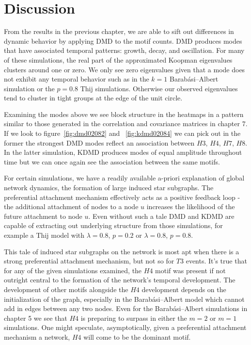 \chapter{Discussion}
From the results in the previous chapter, we are able to sift out differences in dynamic behavior by applying
 DMD to the motif counts. DMD produces modes that have associated temporal
patterns: growth, decay, and oscillation. For many of these simulations, the real part of
 the approximated Koopman eigenvalues clusters around one or zero. We only see zero eigenvalues
given that a mode does not exhibit any temporal behavior such as in the $k=1$ Barabási–Albert 
simulation or the $p=0.8$ Thij simulations. Otherwise our observed eigenvalues tend to cluster
in tight groups at the edge of the unit circle. 

Examining the modes above we see block structure in the heatmaps in a pattern similar to those 
generated in the correlation and covariance matrices in chapter 7. If we look to 
figure~\ref{fig:dmd02082} and ~\ref{fig:kdmd02084} we can pick out in the former the strongest
DMD modes reflect an association between $H3$, $H4$, $H7$, $H8$. In the latter simulation, KDMD produces
modes of equal amplitude throughout time but we can once again see the association between the same motifs. 

For certain simulations, we have a readily available a-priori explanation
of global network dynamics, the formation of large induced star subgraphs. The preferential
attachment mechanism effectively acts as a positive feedback loop - the
additional attachment of nodes to a node $u$ increases
the likelihood of the future attachment to node $u$. Even without 
 such a tale DMD and KDMD are capable of extracting out underlying 
structure from those simulations, for example a Thij model with $\lambda=0.8$, $p=0.2$ or $\lambda=0.8$, $p=0.8$.

This tale of induced star subgraphs on the network is most apt when
there is a strong preferential attachment mechanism, but not so for $T3$ events.
 It's true that for any of the given simulations examined, the $H4$ motif was present if not outright
central to the formation of the network's temporal development. The development
of other motifs alongside the $H4$ development depends on the initialization
of the graph, especially in the Barabási–Albert model which cannot add in
edges between any two nodes. Even for the Barabási–Albert simulations in chapter 5 
we see that $H4$ is preparing to surpass in either the $m=2$ or $m=1$
simulations. One might speculate, asymptotically, given a preferential attachment
mechanism a network, $H4$ will come to be the dominant motif.

